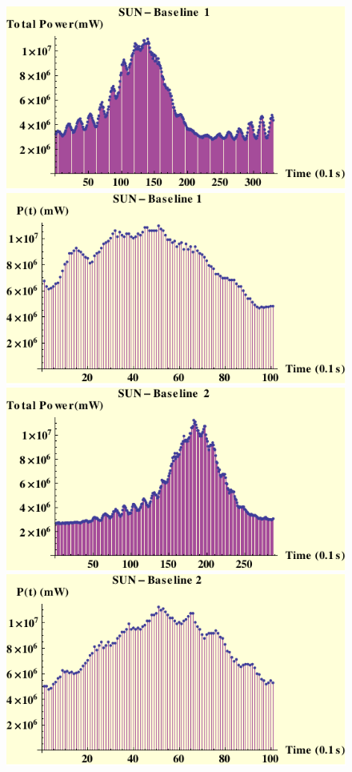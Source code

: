 \begin{figure}[htb]
\begin{center}
 \includegraphics[scale=0.7]{plots/sun1pow.pdf}
 \includegraphics[scale=0.7]{plots/sun1powc.pdf}
 \includegraphics[scale=0.7]{plots/sun2pow.pdf}
 \includegraphics[scale=0.7]{plots/sun2powc.pdf}

\end{center}
\end{figure}
